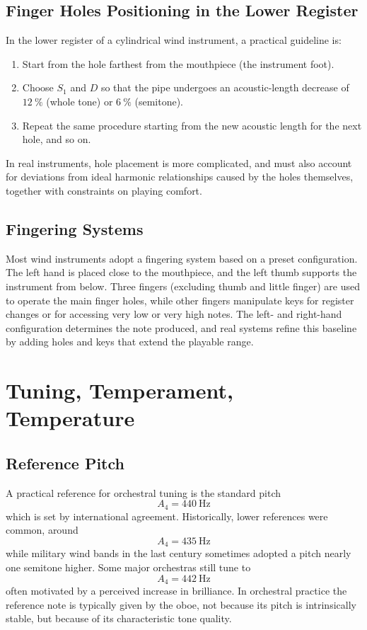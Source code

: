 \subsection{Finger Holes Positioning in the Lower Register}

In the lower register of a cylindrical wind instrument, a practical guideline is:

\begin{enumerate}
    \item Start from the hole farthest from the mouthpiece (the instrument foot).
    \item Choose \( S_1 \) and \( D \) so that the pipe undergoes an acoustic-length decrease of \( \SI{12}{\percent} \) (whole tone) or \( \SI{6}{\percent} \) (semitone).
    \item Repeat the same procedure starting from the new acoustic length for the next hole, and so on.
\end{enumerate}

In real instruments, hole placement is more complicated, and must also account for deviations from ideal harmonic relationships caused by the holes themselves, together with constraints on playing comfort.

\subsection{Fingering Systems}

Most wind instruments adopt a fingering system based on a preset configuration. The left hand is placed close to the mouthpiece, and the left thumb supports the instrument from below. Three fingers (excluding thumb and little finger) are used to operate the main finger holes, while other fingers manipulate keys for register changes or for accessing very low or very high notes. The left- and right-hand configuration determines the note produced, and real systems refine this baseline by adding holes and keys that extend the playable range.

\section{Tuning, Temperament, Temperature}

\subsection{Reference Pitch}

A practical reference for orchestral tuning is the standard pitch
\[
A_4 = \SI{440}{\hertz}
\]
which is set by international agreement. Historically, lower references were common, around
\[
A_4 = \SI{435}{\hertz}
\]
while military wind bands in the last century sometimes adopted a pitch nearly one semitone higher. Some major orchestras still tune to
\[
A_4 = \SI{442}{\hertz}
\]
often motivated by a perceived increase in brilliance. In orchestral practice the reference note is typically given by the oboe, not because its pitch is intrinsically stable, but because of its characteristic tone quality. 
